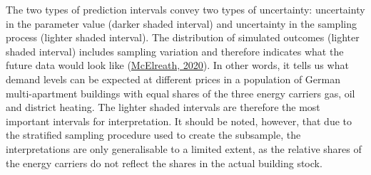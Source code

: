 \documentclass[12pt,twoside]{reedthesis}
\begin{document}
The two types of prediction intervals convey two types of uncertainty: uncertainty in the parameter value (darker shaded interval) and uncertainty in the sampling process (lighter shaded interval). The distribution of simulated outcomes (lighter shaded interval) includes sampling variation and therefore indicates what the future data would look like (\protect\hyperlink{ref-mcelreath20}{McElreath, 2020}). In other words, it tells us what demand levels can be expected at different prices in a population of German multi-apartment buildings with equal shares of the three energy carriers gas, oil and district heating. The lighter shaded intervals are therefore the most important intervals for interpretation. It should be noted, however, that due to the stratified sampling procedure used to create the subsample, the interpretations are only generalisable to a limited extent, as the relative shares of the energy carriers do not reflect the shares in the actual building stock.
\end{document}
